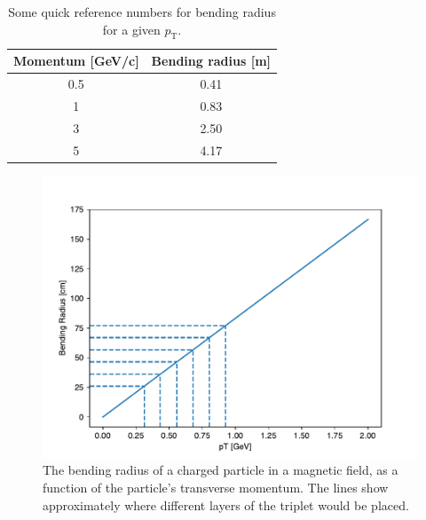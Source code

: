 \documentclass[a4paper, 12pt]{article}
\newcommand{\pt}{\ensuremath{p_{\mathrm{T}}}\xspace}
\begin{document}
\begin{table}
  \centering
  \begin{tabular}{cc}
    \toprule
    Momentum [GeV/c] & Bending radius [m] \\ 
    \midrule
    0.5 & 0.41 \\
    1 & 0.83 \\ 
    3 & 2.50 \\ 
    5 & 4.17 \\ 
    \bottomrule
  \end{tabular}
  \caption{Some quick reference numbers for bending radius for a given \pt.}
  \label{tab:brquick}
\end{table}

\begin{figure}
  \centering
\includegraphics[width=0.5\linewidth]{images/bendingRvP}
  \caption{The bending radius of a charged particle in a magnetic field, as a function of the particle's transverse momentum. 
  The lines show approximately where different layers of the triplet would be placed. }
  \label{fig:bendingRvP}
\end{figure}
\end{document}
